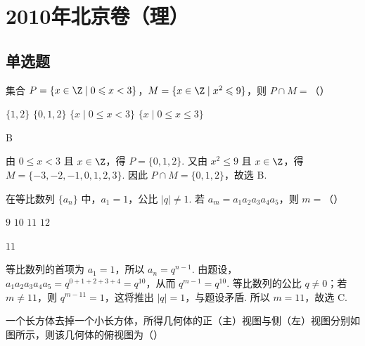 \chapter{2010年北京卷（理）}

\section{单选题}

\begin{problem}
集合 \(P = \{x \in \Z \mid 0 \leqslant x < 3\}\)，\(M = \{x \in \Z \mid x^2 \leqslant 9\}\)，则 \(P \cap M =\)（\quad）

\choices
    {\( \{1, 2\} \)}
    {\(\{0, 1, 2\}\)}
    {\(\{x\mid 0\leqslant x < 3\}\)}
    {\(\{x\mid 0\leqslant x\leqslant 3\}\)}
\end{problem}

\begin{answer}
B
\end{answer}

\begin{solution}
由 \(0\leqslant x<3\) 且 \(x\in\Z\)，得 \(P=\{0,1,2\}\). 又由 \(x^{2}\leqslant9\) 且 \(x\in\Z\)，得 \(M=\{-3,-2,-1,0,1,2,3\}\). 因此 \(P\cap M=\{0,1,2\}\)，故选 B.
\end{solution}

\begin{problem}
在等比数列 \(\{a_{n}\}\) 中，\(a_{1} = 1\)，公比 \(|q| \neq 1\). 若 \(a_{m} = a_{1}a_{2}a_{3}a_{4}a_{5}\)，则 \(m =\)（\quad）

\choices
    {\(9\)}
    {\(10\)}
    {\(11\)}
    {\(12\)}
\end{problem}

\begin{answer}
\(11\)
\end{answer}

\begin{solution}
等比数列的首项为 \(a_{1}=1\)，所以 \(a_{n}=q^{n-1}\). 由题设，\(a_{1}a_{2}a_{3}a_{4}a_{5}=q^{0+1+2+3+4}=q^{10}\)，从而 \(q^{m-1}=q^{10}\). 等比数列的公比 \(q\ne0\)；若 \(m\ne11\)，则 \(q^{m-11}=1\)，这将推出 \(\lvert q\rvert=1\)，与题设矛盾. 所以 \(m=11\)，故选 C.
\end{solution}

\begin{problem}
一个长方体去掉一个小长方体，所得几何体的正（主）视图与侧（左）视图分别如图所示，则该几何体的俯视图为（\quad）


\choices
    {}
    {}
    {}
    {}
\end{problem}

